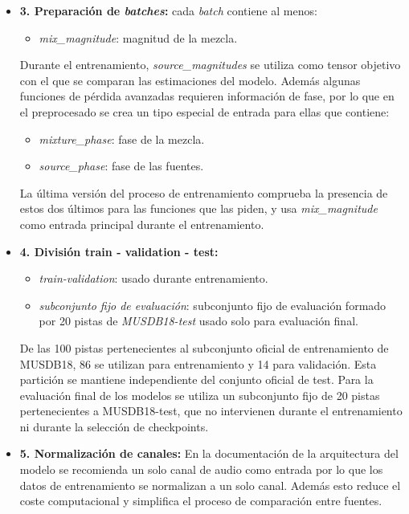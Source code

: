\begin{itemize}
    \item \textbf{3. Preparación de \textit{batches}:}
    cada \textit{batch} contiene al menos:
    \begin{itemize}
        \item \textit{mix\_magnitude}: magnitud de la mezcla.
    \end{itemize}
    Durante el entrenamiento, \textit{source\_magnitudes} se utiliza como tensor objetivo con el que se comparan las estimaciones del modelo.
    Además algunas funciones de pérdida avanzadas requieren información de fase, por lo que en el preprocesado se crea un tipo especial de entrada para ellas que contiene:
    \begin{itemize}
        \item \textit{mixture\_phase}: fase de la mezcla.
        \item \textit{source\_phase}: fase de las fuentes.
    \end{itemize}

    La última versión del proceso de entrenamiento comprueba la presencia de estos dos últimos para las funciones que las piden, y usa \textit{mix\_magnitude} como entrada principal durante el entrenamiento.

    \item \textbf{4. División train - validation - test:}
    \begin{itemize}
        \item \textit{train-validation}: usado durante entrenamiento.
        \item \textit{subconjunto fijo de evaluación}: subconjunto fijo de evaluación formado por 20 pistas de \textit{MUSDB18-test} usado solo para evaluación final.
    \end{itemize}
De las 100 pistas pertenecientes al subconjunto oficial de entrenamiento de MUSDB18, 86 se utilizan para entrenamiento y 14 para validación. Esta partición se mantiene independiente del conjunto oficial de test. Para la evaluación final de los modelos se utiliza un subconjunto fijo de 20 pistas pertenecientes a MUSDB18-test, que no intervienen durante el entrenamiento ni durante la selección de checkpoints.
    \item \textbf{5. Normalización de canales:}
    En la documentación\cite{rafii18} de la arquitectura del modelo se recomienda un solo canal de audio como entrada por lo que los datos de entrenamiento se normalizan a un solo canal. Además esto reduce el coste computacional y simplifica el proceso de comparación entre fuentes.

\end{itemize}

